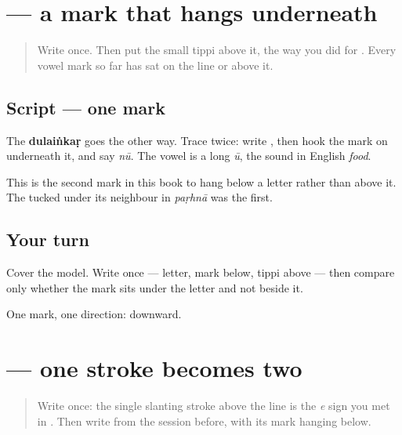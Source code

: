 \section[\texorpdfstring{\pa{ੂ} (uu)}{ੂ (uu)}]{ — a mark that hangs underneath}

\label{lesson:PA-W09-dulainkar}



\begin{quote}
Write \textbf{} once. Then put the small tippi \textbf{} above it, the way you did for \textbf{}. Every vowel mark so far has sat on the line or above it.
\end{quote}

\subsection*{Script — one mark}
The \textbf{dulaiṅkaṛ} goes the other way. Trace \textbf{} twice: write \textbf{}, then hook the mark on underneath it, and say \emph{nū}. The vowel is a long \emph{ū}, the sound in English \emph{food}.

This is the second mark in this book to hang below a letter rather than above it. The \textbf{} tucked under its neighbour in \emph{paṛhnā} was the first.

\subsection*{Your turn}
Cover the model. Write \textbf{} once — letter, mark below, tippi above — then compare only whether the mark sits under the letter and not beside it.

\begin{tcolorbox}[breakable,colback=teal!4,colframe=teal!35!black,title={Before you move on}]
One mark, one direction: downward.
\end{tcolorbox}
\section[\texorpdfstring{\pa{ੈ} (ai)}{ੈ (ai)}]{ — one stroke becomes two}

\label{lesson:PA-W09-dulavan}



\begin{quote}
Write \textbf{} once: the single slanting stroke above the line is the \emph{e} sign you met in \textbf{}. Then write \textbf{} from the session before, with its mark hanging below.
\end{quote}

